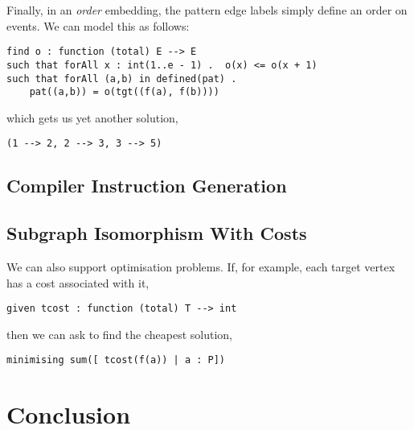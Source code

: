 \documentclass[runningheads]{llncs}
\begin{document}
Finally, in an \emph{order} embedding, the pattern edge labels simply define an order on events. We
can model this as follows:
\begin{lstlisting}
find o : function (total) E --> E
such that forAll x : int(1..e - 1) .  o(x) <= o(x + 1)
such that forAll (a,b) in defined(pat) .
    pat((a,b)) = o(tgt((f(a), f(b))))
\end{lstlisting}
which gets us yet another solution,
\begin{lstlisting}
(1 --> 2, 2 --> 3, 3 --> 5)
\end{lstlisting}

\subsection{Compiler Instruction Generation}

\subsection{Subgraph Isomorphism With Costs}

We can also support optimisation problems. If, for example, each target vertex has a cost associated with it,
\begin{lstlisting}
given tcost : function (total) T --> int
\end{lstlisting}
then we can ask to find the cheapest solution,
\begin{lstlisting}
minimising sum([ tcost(f(a)) | a : P])
\end{lstlisting}

\section{Conclusion}



\end{document}
